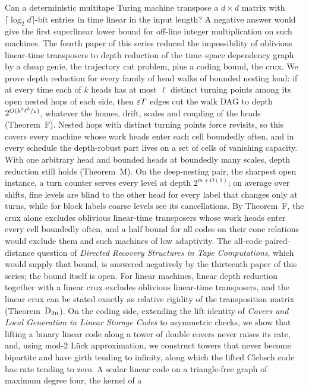 Can a deterministic multitape Turing machine transpose a $d\times d$ matrix with $\lceil\log_2d\rceil$-bit entries in time
linear in the input length? A negative answer would give the first superlinear lower bound for off-line integer multiplication
on such machines. The fourth paper of this series reduced the impossibility of oblivious linear-time transposers to depth
reduction of the time--space dependency graph by a cheap genie, the trajectory cut problem, plus a coding bound, the crux.
We prove depth reduction for every family of head walks of bounded nesting load: if at every time each of $k$ heads has at most
$\ell$ distinct turning points among its open nested hops of each side, then $\varepsilon T$ edges cut the walk DAG to depth
$2^{O(k^3\ell^3/\varepsilon)}$, whatever the homes, drift, scales and coupling of the heads (Theorem~F). Nested hops with distinct
turning points force revisits, so this covers every machine whose work heads enter each cell boundedly often, and in every
schedule the depth-robust part lives on a set of cells of vanishing capacity. With one arbitrary head and bounded heads at
boundedly many scales, depth reduction still holds (Theorem~M). On the deep-nesting pair, the sharpest open instance, a turn
counter serves every level at depth $2^{m+O(1)}$; on average over shifts, fine levels are blind to the other head for every
label that changes only at turns, while for block labels coarse levels see its cancellations. By Theorem~F, the crux alone
excludes oblivious linear-time transposers whose work heads enter every cell boundedly often, and a half bound for all codes
on their cone relations would exclude them and such machines of low adaptivity. The all-code paired-distance question of
\emph{Directed Recovery Structures in Tape Computations}, which would supply that bound, is answered negatively by the
thirteenth paper of this series; the bound itself is open. For linear machines, linear depth reduction together with a linear crux excludes oblivious linear-time
transposers, and the linear crux can be stated exactly as relative rigidity of the transposition matrix (Theorem~$\mathrm{D}_{\mathrm{lin}}$). On
the coding side, extending the lift identity of \emph{Covers and Local Generation in Linear Storage Codes} to asymmetric checks,
we show that lifting a binary linear code along a tower of double covers never raises its rate, and, using mod-$2$ Lück
approximation, we construct towers that never become bipartite and have girth tending to infinity, along which the lifted
Clebsch code has rate tending to zero. A scalar linear code on a triangle-free graph of maximum degree four, the kernel of a
